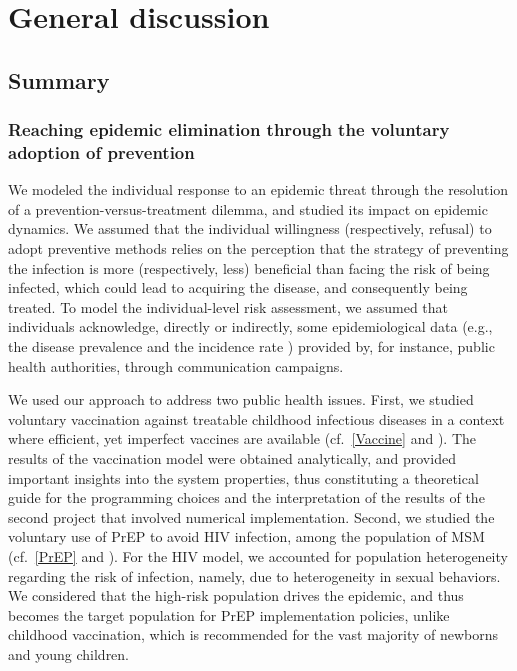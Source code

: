 %
\chapter{General discussion}
\label{Discussion}

\section{Summary}

\subsection{Reaching epidemic elimination through the voluntary adoption of prevention}

We modeled the individual response to an epidemic threat through the resolution of a prevention-versus-treatment dilemma, and studied its impact on epidemic dynamics. We assumed that the individual willingness (respectively, refusal) to adopt preventive methods relies on the perception that the strategy of preventing the infection is more (respectively, less) beneficial than facing the risk of being infected, which could lead to acquiring the disease, and consequently being treated. To model the individual-level risk assessment, we assumed that individuals acknowledge, directly or indirectly, some epidemiological data (e.g., the disease prevalence \cite[]{Jijon2017} and the incidence rate \cite[]{Jijon2021}) provided by, for instance, public health authorities, through communication campaigns. 

We used our approach to address two public health issues. First, we studied voluntary vaccination against treatable childhood infectious diseases in a context where efficient, yet imperfect vaccines are available (cf.~\autoref{Vaccine} and \cite{Jijon2017}). The results of the vaccination model were obtained analytically, and provided important insights into the system properties, thus constituting a theoretical guide for the programming choices and the interpretation of the results of the second project that involved numerical implementation. Second, we studied the voluntary use of PrEP to avoid HIV infection, among the population of MSM (cf.~\autoref{PrEP} and \cite{Jijon2021}). For the HIV model, we accounted for population heterogeneity regarding the risk of infection, namely, due to heterogeneity in sexual behaviors. We considered that the high-risk population drives the epidemic, and thus becomes the target population for PrEP implementation policies, unlike childhood vaccination, which is recommended for the vast majority of newborns and young children. 

